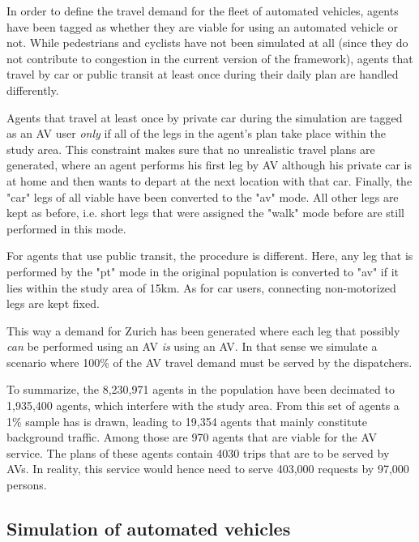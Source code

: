 In order to define the travel demand for the fleet of automated vehicles, agents have been tagged as whether they are viable for using an automated vehicle or not. While pedestrians and cyclists have not been simulated at all (since they do not contribute to congestion in the current version of the framework), agents that travel by car or public transit at least once during their daily plan are handled differently.

Agents that travel at least once by private car during the simulation are tagged as an AV user \textit{only} if all of the legs in the agent's plan take place within the study area. This constraint makes sure that no unrealistic travel plans are generated, where an agent performs his first leg by AV although his private car is at home and then wants to depart at the next location with that car. Finally, the "car" legs of all viable have been converted to the "av" mode. All other legs are kept as before, i.e. short legs that were assigned the "walk" mode before are still performed in this mode.

For agents that use public transit, the procedure is different. Here, any leg that is performed by the "pt" mode in the original population is converted to "av" if it lies within the study area of 15km. As for car users, connecting non-motorized legs are kept fixed.

This way a demand for Zurich has been generated where each leg that possibly \textit{can} be performed using an AV \textit{is} using an AV. In that sense we simulate a scenario where 100\% of the AV travel demand must be served by the dispatchers.

To summarize, the 8,230,971 agents in the population have been decimated to 1,935,400 agents, which interfere with the study area. From this set of agents a 1\% sample has is drawn, leading to 19,354 agents that mainly constitute background traffic. Among those are 970 agents that are viable for the AV service. The plans of these agents contain 4030 trips that are to be served by AVs. In reality, this service would hence need to serve 403,000 requests by 97,000 persons.

\subsection{Simulation of automated vehicles}

